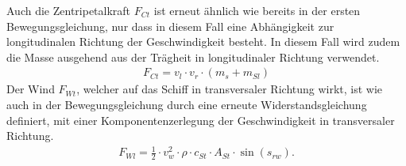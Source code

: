 \documentclass[]{iat}
\begin{document}
Auch die Zentripetalkraft $F_{Ct}$ ist erneut ähnlich wie bereits in der ersten Bewegungsgleichung, nur dass in diesem Fall eine Abhängigkeit zur longitudinalen Richtung der Geschwindigkeit besteht. In diesem Fall wird zudem die Masse ausgehend aus der Trägheit in longitudinaler Richtung verwendet.
\begin{align}
    F_{Ct} = v_l \cdot v_r \cdot (m_{s}+ m_{Sl})
\end{align}
Der Wind $F_{Wt}$, welcher auf das Schiff in transversaler Richtung wirkt, ist wie auch in der Bewegungsgleichung durch eine erneute Widerstandsgleichung definiert, mit einer Komponentenzerlegung der Geschwindigkeit in transversaler Richtung.
\begin{align}
    F_{Wl} = \frac{1}{2} \cdot v_w^2 \cdot \rho \cdot c_{St} \cdot A_{St} \cdot \sin(s_{rw}). \label{eq:wind_wt}
\end{align}
\end{document}
